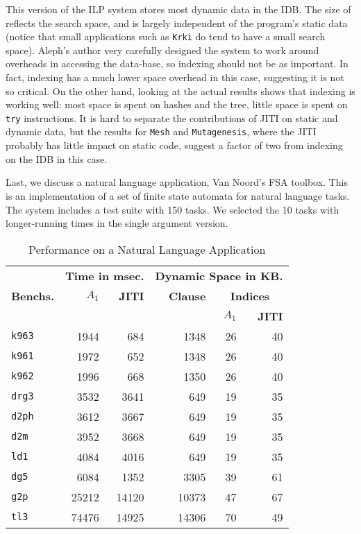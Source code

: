 \documentclass{llncs}
\begin{document}
This version of the ILP system stores most dynamic data in the IDB.
The size of reflects the search space, and is largely independent of
the program's static data (notice that small applications such as
\texttt{Krki} do tend to have a small search space). Aleph's author
very carefully designed the system to work around overheads in
accessing the data-base, so indexing should not be as important.  In
fact, indexing has a much lower space overhead in this case,
suggesting it is not so critical.  On the other hand, looking at the
actual results shows that indexing is working well: most space is
spent on hashes and the tree, little space is spent on \texttt{try}
instructions. It is hard to separate the contributions of JITI on
static and dynamic data, but the results for \texttt{Mesh} and
\texttt{Mutagenesis}, where the JITI probably has little impact on
static code, suggest a factor of two from indexing on the IDB in this
case.

Last, we discuss a natural language application, Van Noord's FSA
toolbox. This is an implementation of a set of finite state automata
for natural language tasks. The system includes a test suite with 150
tasks. We selected the 10 tasks with longer-running times in the
single argument version.

\begin{table}[ht]
  \centering
  \begin {tabular}{|l|r|r||r|r|r||} \hline %
    &  \multicolumn{2}{|c||}{\bf Time in msec.}  &
    \multicolumn{3}{|c||}{\bf Dynamic Space in KB.} \\
    {\bf Benchs.}  & \bf $A_1$   & \bf JITI & \bf Clause & \multicolumn{2}{|c||}{\bf Indices} \\
    &    &  &  & \bf $A_1$   & \bf JITI \\
    \hline
    \texttt{k963}   & 1944 & 684  & 1348   & 26  & 40 \\
    \texttt{k961}   & 1972 & 652  & 1348 & 26 & 40 \\
    \texttt{k962}   & 1996 & 668  & 1350 & 26 & 40 \\
    \texttt{drg3}   & 3532 & 3641 & 649 & 19 & 35 \\
    \texttt{d2ph}   & 3612 & 3667 & 649 & 19 & 35 \\
    \texttt{d2m}    & 3952 & 3668 & 649 & 19 & 35 \\
    \texttt{ld1}    & 4084 & 4016 & 649 & 19 & 35 \\
    \texttt{dg5}    & 6084 & 1352 & 3305 & 39 & 61 \\
    \texttt{g2p}    & 25212& 14120 & 10373 & 47 & 67 \\
    \texttt{tl3}    & 74476& 14925 & 14306 & 70 & 49 \\
    \hline
\end{tabular}
\caption{Performance on a Natural Language Application}
\label{tab:fsa}
\end{table}
\end{document}
